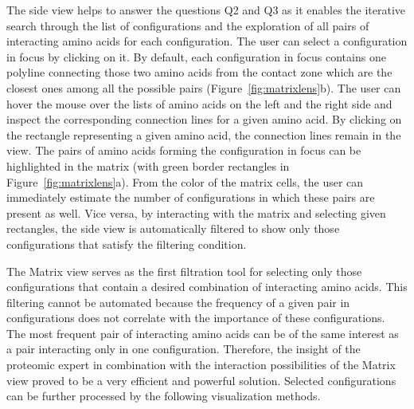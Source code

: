 \documentclass{bmcart}
\def\MatView {Matrix view\xspace}
\begin{document}
The side view helps to answer the questions Q2 and Q3 as it enables the iterative search through the list of configurations and the exploration of all pairs of interacting amino acids for each configuration.
The user can select a configuration in focus by clicking on it. 
By default, each configuration in focus contains one polyline connecting those two amino acids from the contact zone which are the closest ones among all the possible pairs (Figure~\ref{fig:matrixlens}b).
The user can hover the mouse over the lists of amino acids on the left and the right side and inspect the corresponding connection lines for a given amino acid.
By clicking on the rectangle representing a given amino acid, the connection lines remain in the view. 
The pairs of amino acids forming the configuration in focus can be highlighted in the matrix (with green border rectangles in Figure~\ref{fig:matrixlens}a).
From the color of the matrix cells, the user can immediately estimate the number of configurations in which these pairs are present as well.
Vice versa, by interacting with the matrix and selecting given rectangles, the side view is automatically filtered to show only those configurations that satisfy the filtering condition.

The \MatView serves as the first filtration tool for selecting only those configurations that contain a desired combination of interacting amino acids.
This filtering cannot be automated because the frequency of a given pair in configurations does not correlate with the importance of these configurations.
The most frequent pair of interacting amino acids can be of the same interest as a pair interacting only in one configuration.
Therefore, the insight of the proteomic expert in combination with the interaction possibilities of the \MatView proved to be a very efficient and powerful solution.
Selected configurations can be further processed by the following visualization methods.


\end{document}
